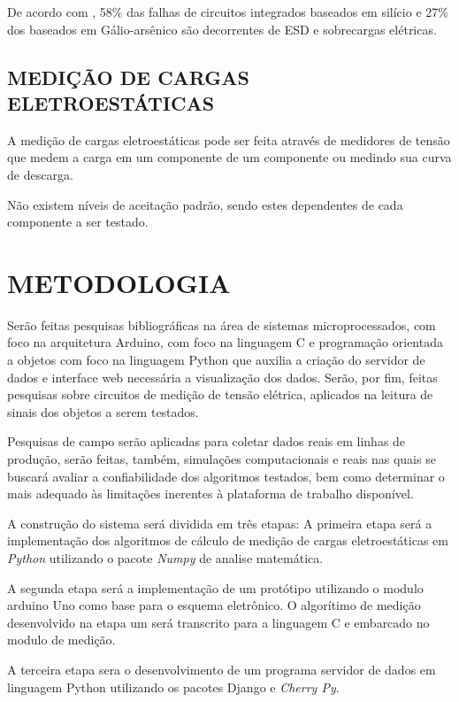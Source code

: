 \documentclass[
	12pt,				%
	openright,			%
	oneside,			%
	a4paper,			%
	chapter=TITLE,		%
	english,			%
	french,				%
	spanish,			%
	brazil,				%
	article,			%
	]{uea-abntex2}
\begin{document}
De acordo com \citeauthor{Hwang2005}, 58\% das falhas de circuitos integrados baseados em silício e 27\% dos baseados em Gálio-arsênico são decorrentes de ESD e sobrecargas elétricas.

\subsection{MEDIÇÃO DE CARGAS ELETROESTÁTICAS}
A medição de cargas eletroestáticas pode ser feita através de medidores de tensão que medem a carga em um componente de um componente ou medindo sua curva de descarga.\cite{Berndt2010}

Não existem níveis de aceitação padrão, sendo estes dependentes de cada componente a ser testado.  
\section{METODOLOGIA}

\hspace*{0.8cm}Serão feitas pesquisas bibliográficas na área de sistemas microprocessados, com foco na arquitetura Arduino, com foco na linguagem C e programação orientada a objetos com foco na linguagem Python\cite{python} que auxilia a criação do servidor de dados e interface web necessária a visualização dos dados. Serão, por fim, feitas pesquisas sobre circuitos de medição de tensão elétrica, aplicados na leitura de sinais dos objetos a serem testados.

Pesquisas de campo serão aplicadas para coletar dados reais em linhas de produção, serão feitas, também, simulações computacionais e reais nas quais se buscará avaliar a confiabilidade dos algoritmos testados, bem como determinar o mais adequado às limitações inerentes à plataforma de trabalho disponível.

A construção do sistema será dividida em três etapas: A primeira etapa será a implementação dos algoritmos de cálculo de medição de cargas eletroestáticas em \textit{Python} utilizando o pacote \textit{Numpy} de analise matemática.\cite{numpy}

A segunda etapa será a implementação de um protótipo utilizando o modulo arduino Uno como base para o esquema eletrônico. O algorítimo de medição desenvolvido na etapa um será transcrito para a linguagem C e embarcado no modulo de medição.  \cite{arduino}

A terceira etapa sera o desenvolvimento de um programa servidor de dados em linguagem Python utilizando os pacotes Django\cite{django} e \textit{Cherry Py}\cite{cherrypy}.
\end{document}
